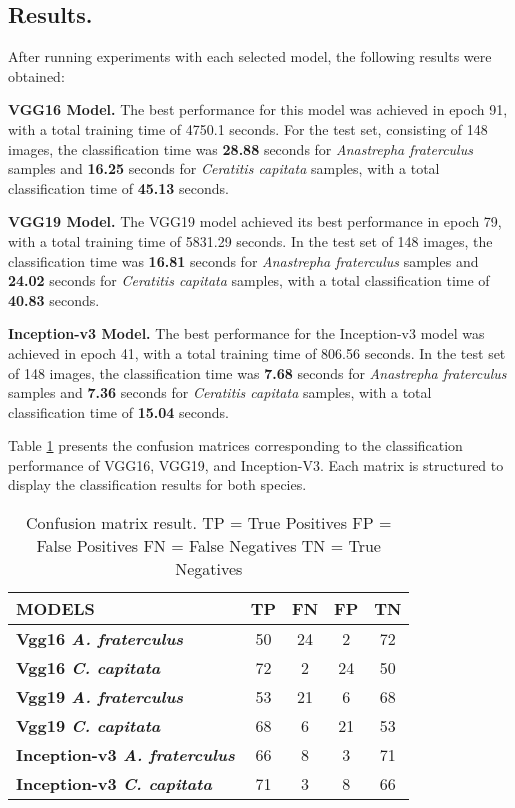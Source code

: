 \subsection{Results.}
After running experiments with each selected model, the following results were obtained:

\textbf{VGG16 Model.} The best performance for this model was achieved in epoch 91, with a total training time of 4750.1 seconds. For the test set, consisting of 148 images, the classification time was \textbf{28.88} seconds for \textit{Anastrepha fraterculus} samples and \textbf{16.25} seconds for \textit{Ceratitis capitata} samples, with a total classification time of \textbf{45.13} seconds.

\textbf{VGG19 Model.} The VGG19 model achieved its best performance in epoch 79, with a total training time of 5831.29 seconds. In the test set of 148 images, the classification time was \textbf{16.81} seconds for \textit{Anastrepha fraterculus} samples and \textbf{24.02} seconds for \textit{Ceratitis capitata} samples, with a total classification time of \textbf{40.83} seconds.

\textbf{Inception-v3 Model.} The best performance for the Inception-v3 model was achieved in epoch 41, with a total training time of 806.56 seconds. In the test set of 148 images, the classification time was \textbf{7.68} seconds for \textit{Anastrepha fraterculus} samples and \textbf{7.36} seconds for \textit{Ceratitis capitata} samples, with a total classification time of \textbf{15.04} seconds.

Table \ref{tab:resultados_experimentos} presents the confusion matrices corresponding to the classification performance of VGG16, VGG19, and Inception-V3. Each matrix is structured to display the classification results for both species.

\begin{table}[htbp]
	\centering
	\caption{Confusion matrix result. TP = True Positives FP = False Positives FN = False Negatives TN = True Negatives}
	\label{tab:resultados_experimentos}
	\begin{tabular}{|l|c|c|c|c|}
		\hline
		\textbf{MODELS} & \textbf{TP} & \textbf{FN} & \textbf{FP} & \textbf{TN}  \\
		   \hline
		\textbf{Vgg16 \textit{A. fraterculus}} & 50 & 24 & 2 & 72 \\
		\hline
		\textbf{Vgg16 \textit{C. capitata}} & 72 & 2 & 24 & 50 \\
		\hline
		\textbf{Vgg19 \textit{A. fraterculus}} & 53 & 21 & 6 & 68 \\
		\hline
		\textbf{Vgg19 \textit{C. capitata}} & 68 & 6 & 21 & 53 \\
		\hline
		\textbf{Inception-v3 \textit{A. fraterculus}} & 66 & 8 & 3 & 71 \\
		\hline
		\textbf{Inception-v3 \textit{C. capitata}} & 71 & 3 & 8 & 66 \\
		\hline
	\end{tabular}
\end{table}

